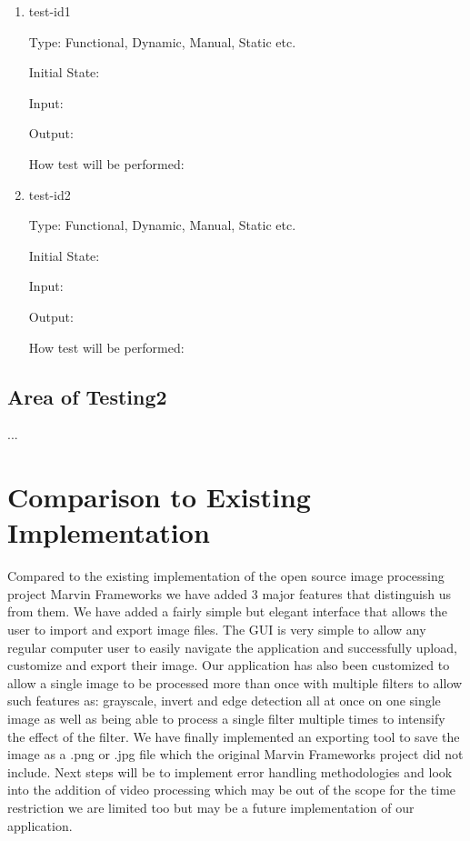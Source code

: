 \documentclass[12pt, titlepage]{article}
\begin{document}
\begin{enumerate}

\item{test-id1\\}

Type: Functional, Dynamic, Manual, Static etc.
					
Initial State: 
					
Input: 
					
Output: 
					
How test will be performed: 
					
\item{test-id2\\}

Type: Functional, Dynamic, Manual, Static etc.
					
Initial State: 
					
Input: 
					
Output: 
					
How test will be performed: 

\end{enumerate}

\subsection{Area of Testing2}

...

	
\section{Comparison to Existing Implementation}	
			Compared to the existing implementation of the open source image processing project Marvin Frameworks we have added 3 major features that distinguish us from them. We have added a fairly simple but elegant interface that allows the user to import and export image files. The GUI is very simple to allow any regular computer user to easily navigate the application and successfully upload, customize and export their image.  Our application has also been customized to allow a single image to be processed more than once with multiple filters to allow such features as: grayscale, invert and edge detection all at once on one single image as well as being able to process a single filter multiple times to intensify the effect of the filter. We have finally implemented an exporting tool to save the image as a .png or .jpg file which the original Marvin Frameworks project did not include. Next steps will be to implement error handling methodologies and look into the addition of video processing which may be out of the scope for the time restriction we are limited too but may be a future implementation of our application.
\end{document}

